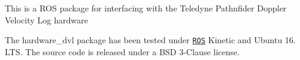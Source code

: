 This is a R\+OS package for interfacing with the Teledyne Pathnfider Doppler Velocity Log hardware

The {\ttfamily hardware\+\_\+dvl} package has been tested under \href{http://www.ros.org}{\tt R\+OS} Kinetic and Ubuntu 16. L\+TS. The source code is released under a B\+SD 3-\/\+Clause license. 
